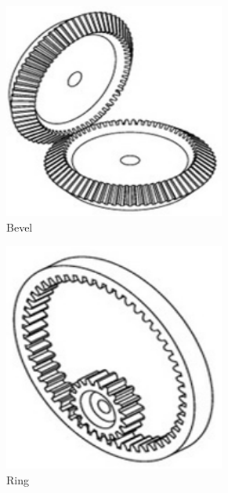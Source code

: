 \documentclass[10pt,letterpaper]{book}
\begin{document}
\begin{figure}[H]
	\begin{subfigure}[b]{.32\linewidth}
		\includegraphics[width=0.8\textwidth]{imgs/gear_bevel.png}
		\caption{Bevel}
	\end{subfigure}\begin{subfigure}[b]{.32\linewidth}
		\includegraphics[width=0.8\textwidth]{imgs/gear_ring.png}
		\caption{Ring}
	\end{subfigure}\begin{subfigure}[b]{.32\linewidth}

\end{subfigure}
\end{figure}
\end{document}

